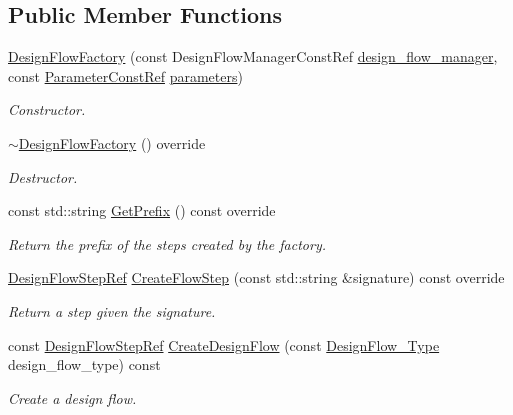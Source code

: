 \subsection*{Public Member Functions}
\begin{DoxyCompactItemize}
\item 
\hyperlink{classDesignFlowFactory_a8b5cd27c16a15aa26cfb34076d30982d}{Design\+Flow\+Factory} (const Design\+Flow\+Manager\+Const\+Ref \hyperlink{classDesignFlowStepFactory_ae7854875d87ed8d2fb4d82b2fa017b79}{design\+\_\+flow\+\_\+manager}, const \hyperlink{Parameter_8hpp_a37841774a6fcb479b597fdf8955eb4ea}{Parameter\+Const\+Ref} \hyperlink{classDesignFlowStepFactory_ab2c8bba23db9f4066e1a27ee7157c2de}{parameters})
\begin{DoxyCompactList}\small\item\em Constructor. \end{DoxyCompactList}\item 
\hyperlink{classDesignFlowFactory_a6d1f0b1bb0441952504d9c36454a341a}{$\sim$\+Design\+Flow\+Factory} () override
\begin{DoxyCompactList}\small\item\em Destructor. \end{DoxyCompactList}\item 
const std\+::string \hyperlink{classDesignFlowFactory_a926debf95513064610a97e5240f5c530}{Get\+Prefix} () const override
\begin{DoxyCompactList}\small\item\em Return the prefix of the steps created by the factory. \end{DoxyCompactList}\item 
\hyperlink{design__flow__step_8hpp_a9dd6b4474ddf52d41a78b1aaa12ae6c8}{Design\+Flow\+Step\+Ref} \hyperlink{classDesignFlowFactory_a4dd446831a1e7d6f5af137beff1d4cab}{Create\+Flow\+Step} (const std\+::string \&signature) const override
\begin{DoxyCompactList}\small\item\em Return a step given the signature. \end{DoxyCompactList}\item 
const \hyperlink{design__flow__step_8hpp_a9dd6b4474ddf52d41a78b1aaa12ae6c8}{Design\+Flow\+Step\+Ref} \hyperlink{classDesignFlowFactory_af22b8c314d4b1ea742ab2527a98bc1de}{Create\+Design\+Flow} (const \hyperlink{design__flow_8hpp_a0701ad2cbf08dc97b38caee3bbbff0c0}{Design\+Flow\+\_\+\+Type} design\+\_\+flow\+\_\+type) const
\begin{DoxyCompactList}\small\item\em Create a design flow. \end{DoxyCompactList}\end{DoxyCompactItemize}
